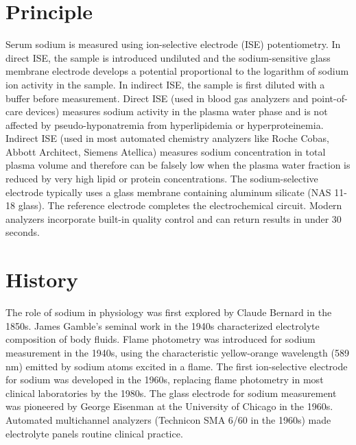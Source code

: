 \section*{Principle}
Serum sodium is measured using ion-selective electrode (ISE) potentiometry. In direct ISE, the sample is introduced undiluted and the sodium-sensitive glass membrane electrode develops a potential proportional to the logarithm of sodium ion activity in the sample. In indirect ISE, the sample is first diluted with a buffer before measurement. Direct ISE (used in blood gas analyzers and point-of-care devices) measures sodium activity in the plasma water phase and is not affected by pseudo-hyponatremia from hyperlipidemia or hyperproteinemia. Indirect ISE (used in most automated chemistry analyzers like Roche Cobas, Abbott Architect, Siemens Atellica) measures sodium concentration in total plasma volume and therefore can be falsely low when the plasma water fraction is reduced by very high lipid or protein concentrations. The sodium-selective electrode typically uses a glass membrane containing aluminum silicate (NAS 11-18 glass). The reference electrode completes the electrochemical circuit. Modern analyzers incorporate built-in quality control and can return results in under 30 seconds.

\section*{History}
The role of sodium in physiology was first explored by Claude Bernard in the 1850s. James Gamble's seminal work in the 1940s characterized electrolyte composition of body fluids. Flame photometry was introduced for sodium measurement in the 1940s, using the characteristic yellow-orange wavelength (589 nm) emitted by sodium atoms excited in a flame. The first ion-selective electrode for sodium was developed in the 1960s, replacing flame photometry in most clinical laboratories by the 1980s. The glass electrode for sodium measurement was pioneered by George Eisenman at the University of Chicago in the 1960s. Automated multichannel analyzers (Technicon SMA 6/60 in the 1960s) made electrolyte panels routine clinical practice.

